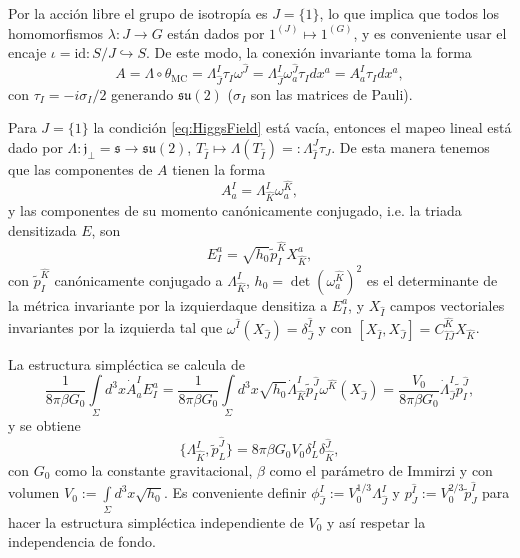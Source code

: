 Por la acci\'{o}n libre el grupo de isotrop\'{i}a es $J=\{1\}$, lo que implica que todos los homomorfismos $\lambda: J \rightarrow G$ est\'{a}n dados por $1^{(J)} \longmapsto 1^{(G)}$, y es conveniente usar el encaje $\iota = \mathrm{id}: S/J \hookrightarrow S$. De este modo, la conexi\'{o}n invariante toma la forma
%
\begin{equation}
A = \Lambda \circ \theta_{\mathrm{MC}} = \Lambda^{I}_{\hat{J}} \tau_{I} \omega^{\hat{J}} =  \Lambda^{I}_{\hat{J}} \omega^{\hat{J}}_{a} \tau_{I} dx^{a}=A^{I}_{a} \tau_{I} dx^{a},
\end{equation}
%
con $\tau_{I} = -i \sigma_{I}/2$ generando $\mathfrak{su}(2)$ ($\sigma_{I}$ son las matrices de Pauli).

Para $J=\{1\}$ la condici\'{o}n \eqref{eq:HiggsField} est\'{a} vac\'{i}a, entonces el mapeo lineal est\'{a} dado por $\Lambda: \mathfrak{j}_{\perp} = \mathfrak{s} \longrightarrow \mathfrak{su}(2)$, $T_{\hat{I}} \longmapsto \Lambda(T_{\hat{I}}) =: \Lambda^{J}_{\hat{I}} \tau_{J}$. De esta manera tenemos que las componentes de $A$ tienen la forma
%
\begin{equation}
A^{I}_{a} = \Lambda^{I}_{\hat{K}} \omega^{\hat{K}}_{a},
\end{equation}
%
y las componentes de su momento can\'{o}nicamente conjugado, i.e. la triada densitizada $E$, son
%
\begin{equation}
E^{a}_{I} = \sqrt{h_{0}} \tilde{p}^{\hat{K}}_{I} X^{a}_{\hat{K}},
\end{equation}
%
con $\tilde{p}^{\hat{K}}_{I}$ can\'{o}nicamente conjugado a $\Lambda^{I}_{\hat{K}}$, $h_{0} = \det(\omega^{\hat{K}}_{a})^{2}$ es el determinante de la m\'{e}trica invariante por la izquierda\footnotemark que densitiza a $E^{a}_{I}$, y $X_{\hat{I}}$ campos vectoriales invariantes por la izquierda tal que $\omega^{\hat{I}}(X_{\hat{J}}) = \delta^{\hat{I}}_{\hat{J}}$ y con $[X_{\hat{I}}, X_{\hat{J}}] = C^{\hat{K}}_{\hat{I} \hat{J}} X_{\hat{K}}$.

La estructura simpl\'{e}ctica se calcula de
%
\begin{equation}
\frac{1}{8 \pi \beta G_{0}} \int\limits_{\Sigma} d^{3} x \dot{A}^{I}_{a} E^{a}_{I} = \frac{1}{8 \pi \beta G_{0}} \int\limits_{\Sigma} d^{3} x \sqrt{h_{0}} \dot{\Lambda}^{I}_{\hat{K}} \tilde{p}^{\hat{J}}_{I} \omega^{\hat{K}} (X_{\hat{J}}) = \frac{V_{0}}{8 \pi \beta G_{0}} \dot{\Lambda}^{I}_{\hat{J}} \tilde{p}^{\hat{J}}_{I},
\end{equation}
%
y se obtiene
%
\begin{equation}
\{\Lambda^{I}_{\hat{K}}, \tilde{p}^{\hat{J}}_{L} \} = 8 \pi \beta G_{0} V_{0} \delta^{I}_{L} \delta^{\hat{J}}_{\hat{K}},
\end{equation}
%
con $G_{0}$ como la constante gravitacional, $\beta$ como el par\'{a}metro de Immirzi y con volumen $V_{0} := \int\limits_{\Sigma} d^{3} x  \sqrt{h_{0}}$. Es conveniente definir $\phi^{I}_{\hat{J}} := V_{0}^{1/3} \Lambda^{I}_{\hat{J}}$ y $p^{\hat{I}}_{J} := V_{0}^{2/3} \tilde{p}^{\hat{I}}_{J}$ para hacer la estructura simpl\'{e}ctica independiente de $V_{0}$ y as\'{i} respetar la independencia de fondo.

